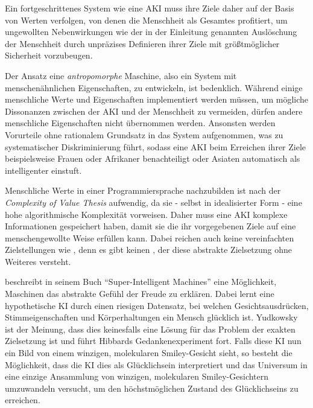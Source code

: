 Ein fortgeschrittenes System wie eine AKI muss ihre Ziele daher auf der Basis von Werten verfolgen, von denen die Menschheit als Gesamtes profitiert, um ungewollten Nebenwirkungen wie der in der Einleitung genannten Auslöschung der Menschheit durch unpräzises Definieren ihrer Ziele mit größtmöglicher Sicherheit vorzubeugen.

Der Ansatz eine \emph{antropomorphe} Maschine, also ein System mit menschenähnlichen Eigenschaften, zu entwickeln, ist bedenklich. Während einige menschliche Werte und Eigenschaften implementiert werden müssen, um mögliche Dissonanzen zwischen der AKI und der Menschheit zu vermeiden, dürfen andere menschliche Eigenschaften nicht übernommen werden. Ansonsten werden Vorurteile ohne rationalem Grundsatz in das System aufgenommen, was zu systematischer Diskriminierung führt, sodass eine AKI beim Erreichen ihrer Ziele beispielsweise Frauen oder Afrikaner benachteiligt oder Asiaten automatisch als intelligenter einstuft.

Menschliche Werte in einer Programmiersprache nachzubilden ist nach der \emph{Complexity of Value Thesis} aufwendig, da sie - selbst in idealisierter Form - eine hohe algorithmische Komplexität vorweisen. Daher muss eine AKI komplexe Informationen gespeichert haben, damit sie die ihr vorgegebenen Ziele auf eine menschengewollte Weise erfüllen kann. Dabei reichen auch keine vereinfachten Zielstellungen wie  , denn es gibt keinen , der diese abstrakte Zielsetzung ohne Weiteres versteht.

\citeauthor{hibbard_super-intelligent_2002} beschreibt in seinem Buch \enquote{Super-Intelligent Machines} eine Möglichkeit, Maschinen das abstrakte Gefühl der Freude zu erklären. Dabei lernt eine hypothetische KI durch einen riesigen Datensatz, bei welchen Gesichtsausdrücken, Stimmeigenschaften und Körperhaltungen ein Mensch glücklich ist. Yudkowsky ist der Meinung, dass dies keinesfalls eine Lösung für das Problem der exakten Zielsetzung ist und führt Hibbards Gedankenexperiment fort. Falls diese KI nun ein Bild von einem winzigen, molekularen Smiley-Gesicht sieht, so besteht die Möglichkeit, dass die KI dies als Glücklichsein interpretiert und das Universum in eine einzige Ansammlung von winzigen, molekularen Smiley-Gesichtern umzuwandeln versucht, um den höchstmöglichen Zustand des Glücklichseins zu erreichen. 

